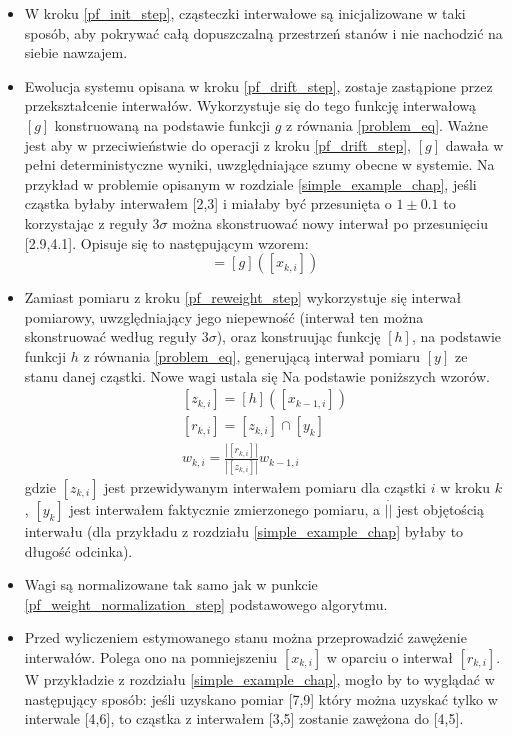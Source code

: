 \begin{itemize}
	\item W kroku \ref{pf_init_step}, cząsteczki interwałowe są inicjalizowane w taki sposób, aby pokrywać całą dopuszczalną przestrzeń stanów i nie nachodzić na siebie nawzajem.
	\item Ewolucja systemu opisana w kroku \ref{pf_drift_step}, zostaje zastąpione przez przekształcenie interwałów. Wykorzystuje się do tego funkcję interwałową $[g]$ konstruowaną na podstawie funkcji $g$ z równania \ref{problem_eq}. Ważne jest aby w przeciwieństwie do operacji z kroku \ref{pf_drift_step}, $[g]$ dawała w pełni deterministyczne wyniki, uwzględniające szumy obecne w systemie. Na przykład w problemie opisanym w rozdziale \ref{simple_example_chap}, jeśli cząstka byłaby interwałem [2,3] i miałaby być przesunięta o $1\pm 0.1$ to korzystając z reguły $3\sigma$ \cite{3_sigma_rule} można skonstruować nowy interwał po przesunięciu [2.9,4.1]. Opisuje się to następującym wzorem:
	\begin{equation}
		[x_{k+1,i}] = [g]([x_{k,i}])
	\end{equation}
	
	\item Zamiast pomiaru z kroku \ref{pf_reweight_step} wykorzystuje się interwał pomiarowy, uwzględniający jego niepewność (interwał ten można skonstruować według reguły $3\sigma$), oraz konstruując funkcję $[h]$, na podstawie funkcji $h$ z równania \ref{problem_eq}, generującą interwał pomiaru $[y]$ ze stanu danej cząstki. Nowe wagi ustala się Na podstawie poniższych wzorów.
	\begin{equation}
		\begin{aligned}
			[z_{k,i}] = [h]([x_{k-1,i}])\\
			[r_{k,i}] = [z_{k,i}] \cap [y_{k}]\\
			w_{k,i} = \frac{|[r_{k,i}]|}{|[z_{k,i}]|} w_{k-1,i}
		\end{aligned}
	\end{equation}
	gdzie $[z_{k,i}]$ jest przewidywanym interwałem pomiaru dla cząstki $i$ w kroku $k$, $[y_{k}]$ jest interwałem faktycznie zmierzonego pomiaru, a $|\dot|$ jest objętością interwału (dla przykładu z rozdziału \ref{simple_example_chap} byłaby to długość odcinka).
	\item Wagi są normalizowane tak samo jak w punkcie \ref{pf_weight_normalization_step} podstawowego algorytmu.
	
	\item Przed wyliczeniem estymowanego stanu można przeprowadzić zawężenie interwałów. Polega ono na pomniejszeniu $[x_{k,i}]$ w oparciu o interwał $[r_{k,i}]$. W przykładzie z rozdziału \ref{simple_example_chap}, mogło by to wyglądać w następujący sposób: jeśli uzyskano pomiar [7,9] który można uzyskać tylko w interwale [4,6], to cząstka z interwałem [3,5] zostanie zawężona do [4,5].
	

\end{itemize}
